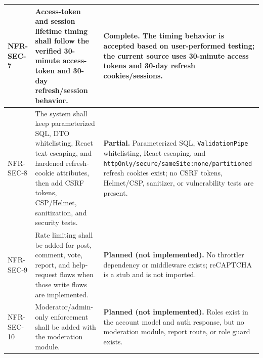 \documentclass[12pt]{article}
\begin{document}
\begin{longtable}{|>{\raggedright\arraybackslash}p{}|>{\raggedright\arraybackslash}p{}|>{\raggedright\arraybackslash}p{}|}
NFR-SEC-7 & Access-token and session lifetime timing shall follow the verified 30-minute access-token and 30-day refresh/session behavior. & \textbf{Complete.} The timing behavior is accepted based on user-performed testing; the current source uses 30-minute access tokens and 30-day refresh cookies/sessions. \\ \hline
NFR-SEC-8 & The system shall keep parameterized SQL, DTO whitelisting, React text escaping, and hardened refresh-cookie attributes, then add CSRF tokens, CSP/Helmet, sanitization, and security tests. & \textbf{Partial.} Parameterized SQL, \texttt{ValidationPipe} whitelisting, React escaping, and \texttt{httpOnly/secure/sameSite:none/partitioned} refresh cookies exist; no CSRF tokens, Helmet/CSP, sanitizer, or vulnerability tests are present. \\ \hline
NFR-SEC-9 & Rate limiting shall be added for post, comment, vote, report, and help-request flows when those write flows are implemented. & \textbf{Planned (not implemented).} No throttler dependency or middleware exists; reCAPTCHA is a stub and is not imported. \\ \hline
NFR-SEC-10 & Moderator/admin-only enforcement shall be added with the moderation module. & \textbf{Planned (not implemented).} Roles exist in the account model and auth response, but no moderation module, report route, or role guard exists. \\ \hline
\end{longtable}
\endgroup
\par\medskip
\end{document}
